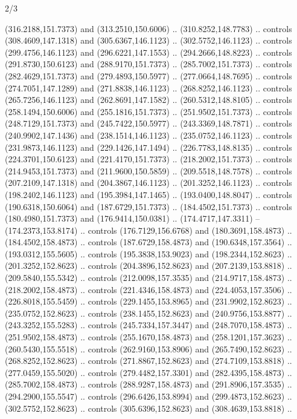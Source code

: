 \begin{flagdescription}{2/3}
\begin{scope}[xshift=0.5\flaglength,yshift=0.5\flagwidth,scale=\flagwidth/267]
\begin{scope}[y=0.8pt, x=0.8pt, yscale=-1,shift={(-250.31,-166.88)}]
  (316.2188,151.7373) and (313.2510,150.6006) .. (310.8252,148.7783) .. controls
  (308.4609,147.1318) and (305.6367,146.1123) .. (302.5752,146.1123) .. controls
  (299.4756,146.1123) and (296.6221,147.1553) .. (294.2666,148.8223) .. controls
  (291.8730,150.6123) and (288.9170,151.7373) .. (285.7002,151.7373) .. controls
  (282.4629,151.7373) and (279.4893,150.5977) .. (277.0664,148.7695) .. controls
  (274.7051,147.1289) and (271.8838,146.1123) .. (268.8252,146.1123) .. controls
  (265.7256,146.1123) and (262.8691,147.1582) .. (260.5312,148.8105) .. controls
  (258.1494,150.6006) and (255.1816,151.7373) .. (251.9502,151.7373) .. controls
  (248.7129,151.7373) and (245.7422,150.5977) .. (243.3369,148.7871) .. controls
  (240.9902,147.1436) and (238.1514,146.1123) .. (235.0752,146.1123) .. controls
  (231.9873,146.1123) and (229.1426,147.1494) .. (226.7783,148.8135) .. controls
  (224.3701,150.6123) and (221.4170,151.7373) .. (218.2002,151.7373) .. controls
  (214.9453,151.7373) and (211.9600,150.5859) .. (209.5518,148.7578) .. controls
  (207.2109,147.1318) and (204.3867,146.1123) .. (201.3252,146.1123) .. controls
  (198.2402,146.1123) and (195.3984,147.1465) .. (193.0400,148.8047) .. controls
  (190.6318,150.6064) and (187.6729,151.7373) .. (184.4502,151.7373) .. controls
  (180.4980,151.7373) and (176.9414,150.0381) .. (174.4717,147.3311) --
  (174.2373,153.8174) .. controls (176.7129,156.6768) and (180.3691,158.4873) ..
  (184.4502,158.4873) .. controls (187.6729,158.4873) and (190.6348,157.3564) ..
  (193.0312,155.5605) .. controls (195.3838,153.9023) and (198.2344,152.8623) ..
  (201.3252,152.8623) .. controls (204.3896,152.8623) and (207.2139,153.8818) ..
  (209.5840,155.5342) .. controls (212.0098,157.3535) and (214.9717,158.4873) ..
  (218.2002,158.4873) .. controls (221.4346,158.4873) and (224.4053,157.3506) ..
  (226.8018,155.5459) .. controls (229.1455,153.8965) and (231.9902,152.8623) ..
  (235.0752,152.8623) .. controls (238.1455,152.8623) and (240.9756,153.8877) ..
  (243.3252,155.5283) .. controls (245.7334,157.3447) and (248.7070,158.4873) ..
  (251.9502,158.4873) .. controls (255.1670,158.4873) and (258.1201,157.3623) ..
  (260.5430,155.5518) .. controls (262.9160,153.8906) and (265.7490,152.8623) ..
  (268.8252,152.8623) .. controls (271.8867,152.8623) and (274.7109,153.8818) ..
  (277.0459,155.5020) .. controls (279.4482,157.3301) and (282.4395,158.4873) ..
  (285.7002,158.4873) .. controls (288.9287,158.4873) and (291.8906,157.3535) ..
  (294.2900,155.5547) .. controls (296.6426,153.8994) and (299.4873,152.8623) ..
  (302.5752,152.8623) .. controls (305.6396,152.8623) and (308.4639,153.8818) ..

\end{scope}
\end{scope}
\end{flagdescription}
